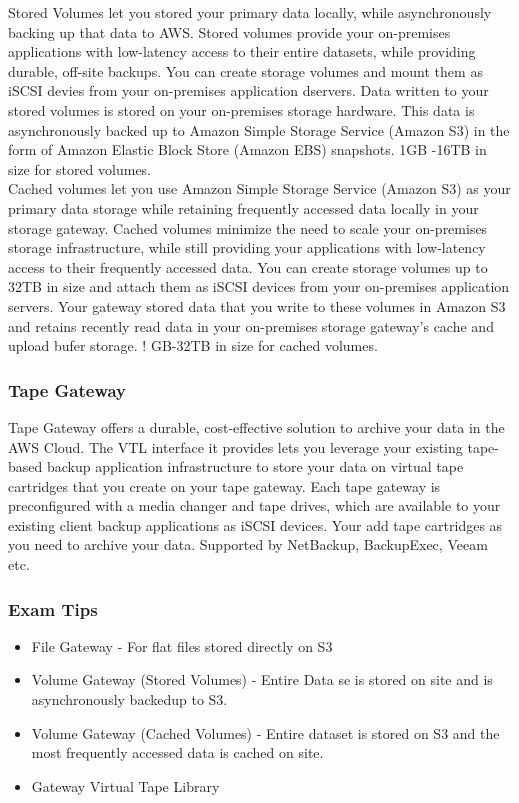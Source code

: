 \documentclass{article}
\begin{document}
		Stored Volumes let you stored your primary data locally, while asynchronously backing up that data to AWS. Stored volumes provide your on-premises applications with low-latency access to their entire datasets, while providing durable, off-site backups. You can create storage volumes and mount them as iSCSI devies from your on-premises application dservers. Data written to your stored volumes is  stored on your on-premises storage hardware. This data is asynchronously backed up to Amazon Simple Storage Service (Amazon S3) in the form of Amazon Elastic Block Store (Amazon EBS) snapshots. 1GB -16TB in size for stored volumes. \\
		
		Cached volumes let you use Amazon Simple Storage Service (Amazon S3) as your primary data storage while retaining frequently accessed data locally in your storage gateway. Cached volumes minimize the need to scale your on-premises storage infrastructure, while still providing your applications with low-latency access to their frequently accessed data. You can create storage volumes up to 32TB in size and attach them as iSCSI devices from your on-premises application servers. Your gateway stored data that you write to these volumes in Amazon S3 and retains recently read data in your on-premises storage gateway's cache and upload bufer storage. ! GB-32TB in size for cached volumes.
		\subsubsection{Tape Gateway}
		Tape Gateway offers a durable, cost-effective solution to archive your data in the AWS Cloud. The VTL interface it provides lets you leverage your existing tape-based backup application infrastructure to store your data on virtual tape cartridges that you create on your tape gateway. Each tape gateway is preconfigured with a media changer and tape drives, which are available to your existing client backup applications as iSCSI devices. Your add tape cartridges as you need to archive your data. Supported by NetBackup, BackupExec, Veeam etc. 
		\subsubsection{Exam Tips}
		\begin{itemize}
		\item
		File Gateway - For flat files stored directly on S3
		
		\item
		Volume Gateway (Stored Volumes) - Entire Data se is stored on site and is asynchronously backedup to S3.
		
		\item
		Volume Gateway (Cached Volumes) - Entire dataset is stored on S3 and the most frequently accessed data is cached on site.
		
		\item
		Gateway Virtual Tape Library
		\end{itemize}
		
\end{document}

